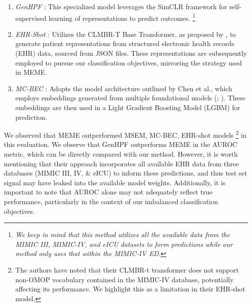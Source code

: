 \documentclass{article}
\theoremstyle{plain}
\theoremstyle{definition}
\theoremstyle{remark}
\begin{document}
\begin{enumerate}
    \item \textit{GenHPF} \citep{hur2023genhpf}: This specialized model leverages the SimCLR framework for self-supervised learning of representations to predict outcomes. \footnote{\textit{We keep in mind that this method utilizes all the available data from the MIMIC III, MIMIC-IV, and eICU datasets to form predictions while our method only uses that within the MIMIC-IV ED.}}

    
    \item \textit{EHR-Shot} \citep{wornow2024ehrshot}: Utilizes the CLMBR-T Base Transformer, as proposed by \citep{steinberg2021language}, to generate patient representations from structured electronic health records (EHR) data, sourced from JSON files. These representations are subsequently employed to pursue our classification objectives, mirroring the strategy used in MEME.
    
    \item \textit{MC-BEC} \citep{chen2023multimodal}: Adopts the model architecture outlined by Chen et al., which employs embeddings generated from multiple foundational models (\cite{huang2019clinicalbert}; \cite{yan2022radbert}). These embeddings are then used in a Light Gradient Boosting Model (LGBM) for prediction.
\end{enumerate}
We observed that MEME outperformed  MSEM, MC-BEC, EHR-shot models \footnote{The authors have noted that their CLMBR-t transformer does not support non-OMOP vocabulary contained in the MIMIC-IV database, potentially affecting its performance. We highlight this as a limitation in their EHR-shot model.} in this evaluation. We observe that GenHPF outperforms MEME in the AUROC metric, which can be directly compared with our method. However, it is worth mentioning that their approach incorporates all available EHR data from three databases (MIMIC III, IV, \& eICU) to inform these predictions, and thus test set signal may have leaked into the available model weights. Additionally, it is important to note that AUROC alone may not adequately reflect true performance, particularly in the context of our imbalanced classification objectives.
\end{document}
